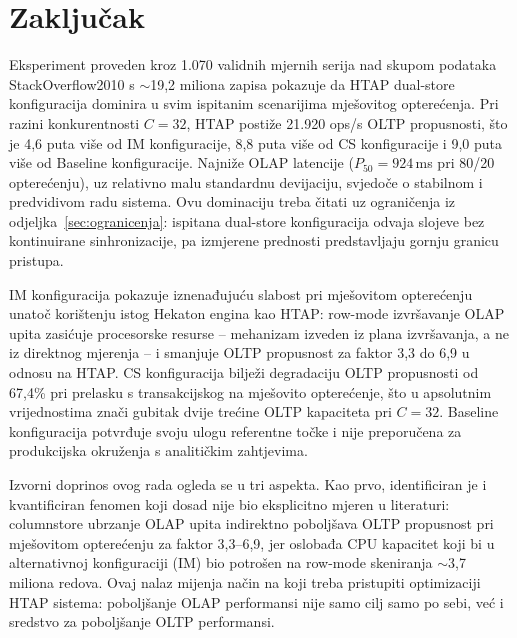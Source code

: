 {}
\chapter*{Zaključak}
\label{ch:zakljucak}

Eksperiment proveden kroz 1.070 validnih mjernih serija nad skupom podataka StackOverflow2010 s $\sim$19,2 miliona zapisa pokazuje da HTAP dual-store konfiguracija dominira u svim ispitanim scenarijima mješovitog opterećenja. Pri razini konkurentnosti $C=32$, HTAP postiže 21.920 ops/s OLTP propusnosti, što je 4,6 puta više od IM konfiguracije, 8,8 puta više od CS konfiguracije i 9,0 puta više od Baseline konfiguracije. Najniže OLAP latencije ($P_{50}=924$\,ms pri 80/20 opterećenju), uz relativno malu standardnu devijaciju, svjedoče o stabilnom i predvidivom radu sistema. Ovu dominaciju treba čitati uz ograničenja iz odjeljka~\ref{sec:ogranicenja}: ispitana dual-store konfiguracija odvaja slojeve bez kontinuirane sinhronizacije, pa izmjerene prednosti predstavljaju gornju granicu pristupa.

IM konfiguracija pokazuje iznenađujuću slabost pri mješovitom opterećenju unatoč korištenju istog Hekaton engina kao HTAP: row-mode izvršavanje OLAP upita zasićuje procesorske resurse -- mehanizam izveden iz plana izvršavanja, a ne iz direktnog mjerenja -- i smanjuje OLTP propusnost za faktor 3,3 do 6,9 u odnosu na HTAP. CS konfiguracija bilježi degradaciju OLTP propusnosti od 67,4\% pri prelasku s transakcijskog na mješovito opterećenje, što u apsolutnim vrijednostima znači gubitak dvije trećine OLTP kapaciteta pri $C=32$. Baseline konfiguracija potvrđuje svoju ulogu referentne točke i nije preporučena za produkcijska okruženja s analitičkim zahtjevima.

Izvorni doprinos ovog rada ogleda se u tri aspekta. Kao prvo, identificiran je i kvantificiran fenomen koji dosad nije bio eksplicitno mjeren u literaturi: columnstore ubrzanje OLAP upita indirektno poboljšava OLTP propusnost pri mješovitom opterećenju za faktor 3,3--6,9, jer oslobađa CPU kapacitet koji bi u alternativnoj konfiguraciji (IM) bio potrošen na row-mode skeniranja $\sim$3,7 miliona redova. Ovaj nalaz mijenja način na koji treba pristupiti optimizaciji HTAP sistema: poboljšanje OLAP performansi nije samo cilj samo po sebi, već i sredstvo za poboljšanje OLTP performansi.

